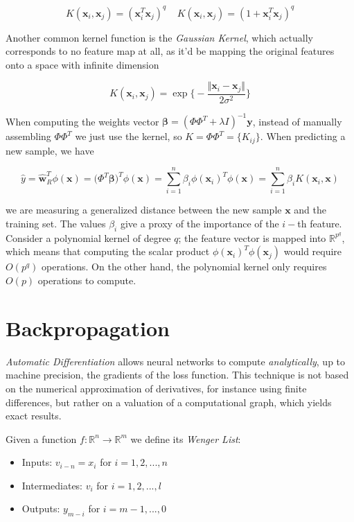 \documentclass{article}
\numberwithin{equation}{subsection}
\begin{document}
\begin{equation*}
    K(\textbf{x}_i,\textbf{x}_j) = (\textbf{x}_i^T \textbf{x}_j)^q \;\;\;\; K(\textbf{x}_i,\textbf{x}_j) = (1+\textbf{x}_i^T \textbf{x}_j)^q
\end{equation*}

Another common kernel function is the \textit{Gaussian Kernel}, which actually corresponds to no feature map at all, as it'd be mapping the original features onto a space with infinite dimension

\begin{equation*}
    K(\textbf{x}_i, \textbf{x}_j) = \exp\Bigg\{ - \frac{\Vert \textbf{x}_i - \textbf{x}_j \Vert}{2 \sigma^2} \Bigg\}
\end{equation*}

When computing the weights vector $\boldsymbol{\beta} = (\Phi\Phi^T + \lambda I)^{-1}\textbf{y}$, instead of manually assembling $\Phi \Phi^T$ we just use the kernel, so $K = \Phi \Phi^T = \{ K_{ij} \}$. When predicting a new sample, we have

\begin{equation*}
    \hat{y} = \hat{\textbf{w}}_R^T \phi(\textbf{x}) =  \big( \Phi^T \boldsymbol{\beta} \big)^T \phi(\textbf{x}) = \sum_{i=1}^n \beta_i \phi(\textbf{x}_i)^T \phi(\textbf{x}) = \sum_{i=1}^n \beta_i K(\textbf{x}_i, \textbf{x})
\end{equation*}

we are measuring a generalized distance between the new sample $\textbf{x}$ and the training set. The values $\beta_i$ give a proxy of the importance of the $i-$th feature. Consider a polynomial kernel of degree $q$; the feature vector is mapped into $\mathbb{R}^{p^q}$, which means that computing the scalar product $\phi(\textbf{x}_i)^T\phi(\textbf{x}_j)$ would require $O(p^q)$ operations. On the other hand, the polynomial kernel only requires $O(p)$ operations to compute.

\section{Backpropagation}
\textit{Automatic Differentiation} allows neural networks to compute \textit{analytically}, up to machine precision, the gradients of the loss function. This technique is not based on the numerical approximation of derivatives, for instance using finite differences, but rather on a valuation of a computational graph, which yields exact results.

Given a function $f : \mathbb{R}^{n} \to \mathbb{R}^m$ we define its \textit{Wenger List}:
\begin{itemize}
    \item Inputs: $v_{i-n} = x_i$ for $i = 1,2,...,n$
    \item Intermediates: $v_i$ for $i = 1,2,...,l$
    \item Outputs: $y_{m-i}$ for $i = m-1, ...,0$
\end{itemize}
\end{document}
